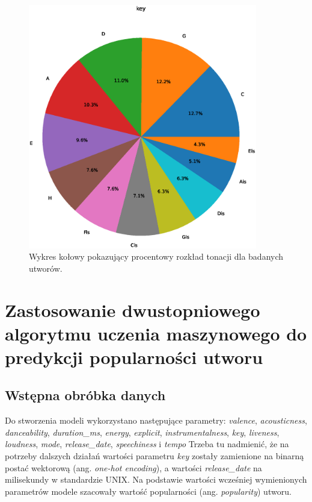 \documentclass[a4paper,11pt]{article}
\begin{document}
    \smallskip

    \begin{figure}[H]
        \label{fig:key}
        \centering
        \includegraphics[width=10cm,keepaspectratio]{key}
        \caption{Wykres kołowy pokazujący procentowy rozkład tonacji dla badanych utworów.}
    \end{figure}


    \section{Zastosowanie dwustopniowego algorytmu uczenia maszynowego do predykcji popularności utworu}

    \subsection{Wstępna obróbka danych}

    Do stworzenia modeli wykorzystano następujące parametry: \textit{valence}, \textit{acousticness}, \textit{danceability}, \textit{duration\_ms}, \textit{energy}, \textit{explicit}, \textit{instrumentalness}, \textit{key}, \textit{liveness}, \textit{loudness}, \textit{mode}, \textit{release\_date}, \textit{speechiness} i \textit{tempo} Trzeba tu nadmienić, że na potrzeby dalszych działań wartości parametru \textit{key} zostały zamienione na binarną postać wektorową (ang. \textit{one-hot encoding}), a wartości \textit{release\_date} na milisekundy w standardzie UNIX. Na podstawie wartości wcześniej wymienionych parametrów modele szacowały wartość popularności (ang. \textit{popularity}) utworu.
\end{document}
